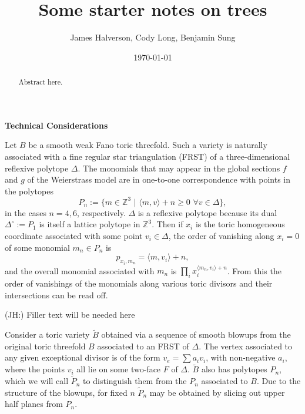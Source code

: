 \documentclass[aps,prl,twocolumn, superscriptaddress,groupedaddress,nofootinbib]{revtex4}
\newcommand{\bZ}{\mathbb{Z}}
\newcommand{\jh}[1]{{\color{red}(JH:) #1}}
\begin{document}
\title{Some starter notes on trees}
\author{James Halverson, Cody Long, Benjamin Sung}

\date{\today}

\begin{abstract}
Abstract here.
\end{abstract}

\maketitle

\noindent \textbf{Technical Considerations}

Let $B$ be a smooth weak Fano toric threefold. Such a variety is naturally
associated with a  fine regular star triangulation (FRST) of a three-dimensional reflexive polytope $\Delta$.
The monomials that may appear in the global sections $f$ and $g$ of the Weierstrass model are 
in one-to-one correspondence with points in the polytopes
\begin{equation} 
P_n := \{m \in \bZ^3 \,\,|\,\, \langle m,v\rangle + n \geq 0 \,\, \forall v \in \Delta \},
\end{equation}
in the cases $n=4,6$, respectively. $\Delta$ is a reflexive polytope because its dual
$\Delta^\circ:=P_1$ is itself a lattice polytope in $\bZ^3$. Then if $x_i$ is the toric
homogeneous coordinate associated with some point $v_i\in \Delta$, the order of vanishing
along $x_i=0$ of some monomial $m_n\in P_n$ is 
\begin{equation}
p_{x_i,m_n} = \langle m,v_i\rangle +n,
\end{equation}
and the overall monomial associated with $m_n$ is $\prod_i x_i^{\langle m_n, v_i\rangle+n}$.
From this the order of vanishings of the monomials along various toric divisors and their intersections
can be read off.

\jh{Filler text will be needed here}

Consider a toric variety $\tilde B$ obtained via a sequence of smooth blowups from the original toric threefold $B$ associated to an FRST of $\Delta$. The vertex associated to any given exceptional divisor is of the form $v_e=\sum a_i v_i$, with non-negative $a_i$, where the points $v_i$ all
lie on some two-face $F$ of $\Delta$. $\tilde B$ also has polytopes $P_n$, which we will call $\tilde P_n$
to distinguish them from the $P_n$ associated to $B$.  Due to the structure of the blowups, for fixed
$n$ $\tilde P_n$ may be obtained by slicing out upper half planes from $P_n$.
\end{document}
